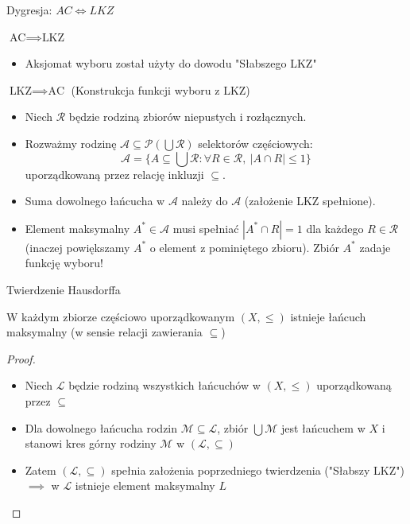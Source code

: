 \documentclass[aspectratio=169,11pt,t,envcountsect,professionalfonts]{beamer}
\begin{document}
\begin{frame}{Dygresja: $AC \iff LKZ $}
    \begin{block}{$\text{AC} \implies \text{LKZ}$} 
        \begin{itemize} 
            \item Aksjomat wyboru został użyty do dowodu "Słabszego LKZ"
        \end{itemize} 
    \end{block} 
    \begin{block}{$\text{LKZ} \implies \text{AC}$ (Konstrukcja funkcji wyboru z LKZ)} 
        \begin{itemize} 
            \item Niech $\mathcal{R}$ będzie rodziną zbiorów niepustych i rozłącznych. 
            \item Rozważmy rodzinę $\mathcal{A} \subseteq \mathcal{P}(\bigcup \mathcal{R})$ selektorów częściowych: 
            $$\mathcal{A} = \{ A \subseteq \bigcup \mathcal{R} : \forall R \in \mathcal{R},\ |A \cap R| \le 1 \} $$ uporządkowaną przez relację inkluzji $\subseteq$. 
            \item Suma dowolnego łańcucha w $\mathcal{A}$ należy do $\mathcal{A}$ (założenie LKZ spełnione). 
            \item Element maksymalny $A^* \in \mathcal{A}$ musi spełniać $|A^* \cap R| = 1$ dla każdego $R \in \mathcal{R}$ (inaczej powiększamy $A^*$ o element z pominiętego zbioru). Zbiór $A^*$ zadaje funkcję wyboru! 
        \end{itemize} 
    \end{block} 
\end{frame}
    

\begin{frame}{Twierdzenie Hausdorffa}
    \begin{mythm}[Hausdorffa]
        W każdym zbiorze częściowo uporządkowanym $(X, \leqslant)$ istnieje łańcuch maksymalny (w sensie relacji zawierania $\subseteq$)
    \end{mythm}
    \begin{proof}
        \begin{itemize}
            \item Niech $\mathcal{L}$ będzie rodziną wszystkich łańcuchów w $(X, \leqslant)$ uporządkowaną przez $\subseteq$
            \item Dla dowolnego łańcucha rodzin $\mathcal{M} \subseteq \mathcal{L}$, zbiór $\bigcup \mathcal{M}$ jest łańcuchem w $X$ i stanowi kres górny rodziny $\mathcal{M}$ w $(\mathcal{L}, \subseteq)$
            \item Zatem $(\mathcal{L}, \subseteq)$ spełnia założenia poprzedniego twierdzenia ("Słabszy LKZ")  $\implies$ w $\mathcal{L}$ istnieje element maksymalny $L$
        \end{itemize}
    \end{proof}
\end{frame}
\end{document}
